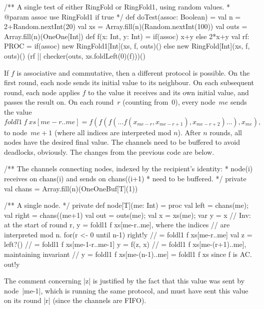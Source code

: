 \begin{answer}
\begin{scala}
  /** A single test of either RingFold or RingFold1, using random values.
    * @param assoc use RingFold1 if true */
  def doTest(assoc: Boolean) = {
    val n = 2+Random.nextInt(20)
    val xs = Array.fill(n)(Random.nextInt(100))
    val outs = Array.fill(n)(OneOne[Int])
    def f(x: Int, y: Int) = if(assoc) x+y else 2*x+y
    val rf: PROC =
      if(assoc) new RingFold1[Int](xs, f, outs)()
      else new RingFold[Int](xs, f, outs)()
    (rf || checker(outs, xs.foldLeft(0)(f)))()
  }
\end{scala}


If $f$ is associative and commutative, then a different protocol is possible.
On the first round, each node sends its initial value to its neighbour.  On
each subsequent round, each node applies $f$ to the value it receives and its
own initial value, and passes the result on.  On each round~$r$ (counting
from~0), every node~$me$ sends the value
\[
foldl1~f~xs[me-r..me] =
  f(f(f(\ldots f(x_{me-r}, x_{me-r+1}), x_{me-r+2}) \ldots ), x_{me}),
\]
to node~$me+1$ (where all indices are interpreted mod $n$).  After $n$
rounds, all nodes have the desired final value.  The channels need to be
buffered to avoid deadlocks, obviously.  The changes from the previous code
are below.  
\begin{scala}
  /** The channels connecting nodes, indexed by the recipient's identity:
    * node(i) receives on chans(i) and sends on chans((i+1)%
    * need to be buffered. */
  private val chans = Array.fill(n)(OneOneBuf[T](1)) 

  /** A single node. */
  private def node[T](me: Int) = proc{
    val left = chans(me); val right = chans((me+1)%
    val out = outs(me); val x = xs(me); var y = x
    // Inv: at the start of round r, y = foldl1 f xs[me-r..me], where the indices
    // are interpreted mod n. 
    for(r <- 0 until n-1){
      right!y         // = foldl1 f xs[me-r..me]
      val z = left?() // = foldl1 f xs[me-1-r..me-1]
      y = f(z, x)     // = foldl1 f xs[me-(r+1)..me], maintaining invariant
    }
    // y = foldl1 f xs[me-(n-1)..me] = foldl1 f xs since f is AC.
    out!y
  }  
\end{scala}
%
The comment concerning |z| is justified by the fact that this value was sent
by node~|me-1|, which is running the same protocol, and must have sent this
value on its round |r| (since the channels are FIFO). 
\end{answer}
